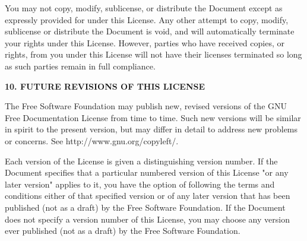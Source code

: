 \documentclass[a4paper,11pt]{article}
\begin{document}
You may not copy, modify, sublicense, or distribute the Document except
as expressly provided for under this License.  Any other attempt to
copy, modify, sublicense or distribute the Document is void, and will
automatically terminate your rights under this License.  However,
parties who have received copies, or rights, from you under this
License will not have their licenses terminated so long as such
parties remain in full compliance.


\begin{center}
{\Large\bf 10. FUTURE REVISIONS OF THIS LICENSE}
\end{center}


The Free Software Foundation may publish new, revised versions
of the GNU Free Documentation License from time to time.  Such new
versions will be similar in spirit to the present version, but may
differ in detail to address new problems or concerns.  See
http://www.gnu.org/copyleft/.

Each version of the License is given a distinguishing version number.
If the Document specifies that a particular numbered version of this
License "or any later version" applies to it, you have the option of
following the terms and conditions either of that specified version or
of any later version that has been published (not as a draft) by the
Free Software Foundation.  If the Document does not specify a version
number of this License, you may choose any version ever published (not
as a draft) by the Free Software Foundation.


\end{document}
